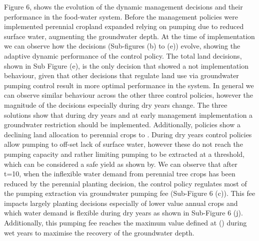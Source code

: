 \documentclass[11pt,a4paper]{article}
\begin{document}
Figure 6, shows the evolution of the dynamic management decisions and their performance in the food-water system. Before the management policies were implemented perennial cropland expanded relying on pumping due to reduced surface water, augmenting the groundwater depth. At the time of implementation we can observe how the decisions (Sub-figures (b) to (e)) evolve, showing the adaptive dynamic performance of the control policy. The total land decisions, shown in Sub Figure (e), is the only decision that showed a not implementation behaviour, given that other decisions that regulate land use via groundwater pumping control result in more optimal performance in the system. In general we can observe similar behaviour across the other three control policies, however the magnitude of the decisions especially during dry years change. The three solutions show that during dry years and at early management implementation a groundwater restriction should be implemented. Additionally, policies show a declining land allocation to perennial crops to . During dry years control policies allow pumping to off-set lack of surface water, however these do not reach the pumping capacity and rather limiting pumping to be extracted at a threshold, which can be considered a safe yield as shown by\cite{miro}. We can observe that after t=10, when the inflexible water demand from perennial tree crops has been reduced by the perennial planting decision, the control policy regulates most of the pumping extraction via groundwater pumping fee (Sub-Figure 6 (c)). This fee impacts largely planting decisions especially of lower value annual crops and which water demand is flexible during dry years as shown in Sub-Figure 6 (j). Additionally, this pumping fee reaches the maximum value defined at () during wet years to maximise the recovery of the groundwater depth. 
\end{document}
